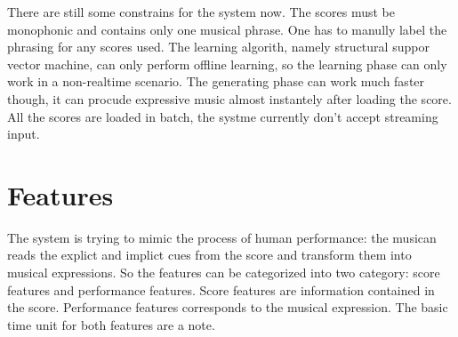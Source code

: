 There are still some constrains for the system now. The scores must be monophonic and contains only one musical phrase. One has to manully label the phrasing for any scores used. The learning algorith, namely structural suppor vector machine, can only perform offline learning, so the learning phase can only work in a non-realtime scenario. The generating phase can work much faster though, it can procude expressive music almost instantely after loading the score. All the scores are loaded in batch, the systme currently don't accept streaming input.

   \section{Features}
   The system is trying to mimic the process of human performance: the musican reads the explict and implict cues from the score and transform them into musical expressions. So the features can be categorized into two category: score features and performance features.  Score features are information contained in the score. Performance features corresponds to the musical expression. The basic time unit for both features are a note. 
